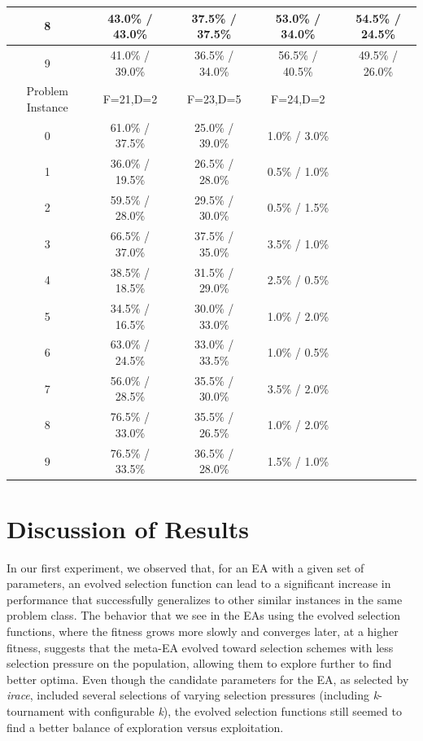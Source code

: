 \documentclass[times,12pt,titlepage]{mstogs}
\begin{document}
\begin{ThesisBody}
\begin{table}
\begin{tabular}{c|c|c|c|c}
	\hline
	8 & 43.0\% / 43.0\% & 37.5\% / 37.5\% & 53.0\% / 34.0\% & 54.5\% / 24.5\%\\
	\hline
	9 & 41.0\% / 39.0\% & 36.5\% / 34.0\% & 56.5\% / 40.5\% & 49.5\% / 26.0\%\\
	\hline
	\hline
	Problem Instance & F=21,D=2 & F=23,D=5 & F=24,D=2\\
	\hline
	0 & 61.0\% / 37.5\% & 25.0\% / 39.0\% & 1.0\% / 3.0\%& \\
	\hline
	1 & 36.0\% / 19.5\% & 26.5\% / 28.0\% & 0.5\% / 1.0\%& \\
	\hline
	2 & 59.5\% / 28.0\% & 29.5\% / 30.0\% & 0.5\% / 1.5\%& \\
	\hline
	3 & 66.5\% / 37.0\% & 37.5\% / 35.0\% & 3.5\% / 1.0\%& \\
	\hline
	4 & 38.5\% / 18.5\% & 31.5\% / 29.0\% & 2.5\% / 0.5\%& \\
	\hline
	5 & 34.5\% / 16.5\% & 30.0\% / 33.0\% & 1.0\% / 2.0\%& \\
	\hline
	6 & 63.0\% / 24.5\% & 33.0\% / 33.5\% & 1.0\% / 0.5\%& \\
	\hline
	7 & 56.0\% / 28.5\% & 35.5\% / 30.0\% & 3.5\% / 2.0\%& \\
	\hline
	8 & 76.5\% / 33.0\% & 35.5\% / 26.5\% & 1.0\% / 2.0\%& \\
	\hline
	9 & 76.5\% / 33.5\% & 36.5\% / 28.0\% & 1.5\% / 1.0\%& \\
	
  \bottomrule
\end{tabular}
\end{table}

\section{Discussion of Results}
\label{resultsDiscussion}

In our first experiment, we observed that, for an EA with a given set of parameters, an evolved selection function can lead to a significant increase in performance that successfully generalizes to other similar instances in the same problem class. The behavior that we see in the EAs using the evolved selection functions, where the fitness grows more slowly and converges later, at a higher fitness, suggests that the meta-EA evolved toward selection schemes with less selection pressure on the population, allowing them to explore further to find better optima. Even though the candidate parameters for the EA, as selected by \textit{irace}, included several selections of varying selection pressures (including \textit{k}-tournament with configurable \textit{k}), the evolved selection functions still seemed to find a better balance of exploration versus exploitation.


\end{ThesisBody}
\end{document}

